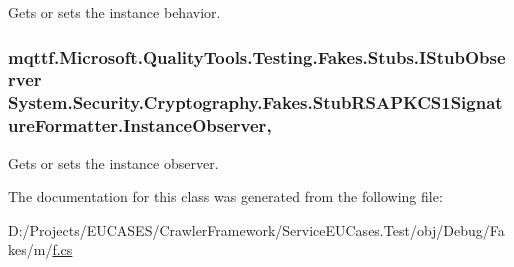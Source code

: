 Gets or sets the instance behavior.

\hypertarget{class_system_1_1_security_1_1_cryptography_1_1_fakes_1_1_stub_r_s_a_p_k_c_s1_signature_formatter_a665f92f8f9a099b99c0ec08ed786b5ba}{
\subsubsection[{Instance\-Observer}]{\setlength{\rightskip}{0pt plus 5cm}mqttf.\-Microsoft.\-Quality\-Tools.\-Testing.\-Fakes.\-Stubs.\-I\-Stub\-Observer System.\-Security.\-Cryptography.\-Fakes.\-Stub\-R\-S\-A\-P\-K\-C\-S1\-Signature\-Formatter.\-Instance\-Observer\hspace{0.3cm}{\ttfamily [get]}, {\ttfamily [set]}}}\label{class_system_1_1_security_1_1_cryptography_1_1_fakes_1_1_stub_r_s_a_p_k_c_s1_signature_formatter_a665f92f8f9a099b99c0ec08ed786b5ba}


Gets or sets the instance observer.



The documentation for this class was generated from the following file\-:\begin{DoxyCompactItemize}
\item 
D\-:/\-Projects/\-E\-U\-C\-A\-S\-E\-S/\-Crawler\-Framework/\-Service\-E\-U\-Cases.\-Test/obj/\-Debug/\-Fakes/m/\hyperlink{m_2f_8cs}{f.\-cs}\end{DoxyCompactItemize}
